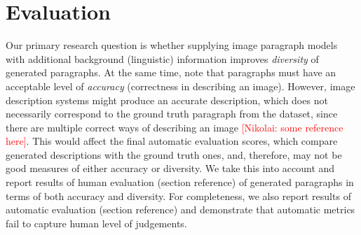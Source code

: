 \documentclass[11pt,a4paper]{article}
\newcommand{\kibitz}[2]{\ifnum\Comments=1\textcolor{#1}{#2}\fi}
\newcommand{\nikolai}[1]{\kibitz{red}      {[Nikolai: #1]}}
\begin{document}

\section{Evaluation}
Our primary research question is whether supplying image paragraph models with additional background (linguistic) information improves \textit{diversity} of generated paragraphs.
At the same time, note that paragraphs must have an acceptable level of \textit{accuracy} (correctness in describing an image).
However, image description systems might produce an accurate description, which does not necessarily correspond to the ground truth paragraph from the dataset, since there are multiple correct ways of describing an image \nikolai{some reference here}.
This would affect the final automatic evaluation scores, which compare generated descriptions with the ground truth ones, and, therefore, may not be good measures of either accuracy or diversity.
We take this into account and report results of human evaluation (section reference) of generated paragraphs in terms of both accuracy and diversity.
For completeness, we also report results of automatic evaluation (section reference) and demonstrate that automatic metrics fail to capture human level of judgements.
\end{document}
